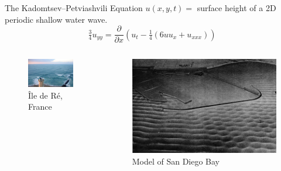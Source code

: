 \documentclass{beamer}
\begin{document}
\begin{frame}{The Kadomtsev--Petviashvili Equation}{}
  \vspace{10pt}
  $u(x,y,t) = $ surface height of a 2D periodic shallow water wave.
  \[
  \tfrac{3}{4} u_{yy} = \frac{\partial}{\partial x} \left(
  u_t - \tfrac{1}{4} \left(6uu_x + u_{xxx}\right) \right)
  \]

  \begin{columns}[T]
    \begin{column}{0.5\textwidth}
      \begin{figure}
        \centering
        \includegraphics[width=\textwidth]{images/livekp.jpg}
        \caption{\^{I}le de R\'{e}, France}
      \end{figure}
    \end{column}
    \begin{column}{0.5\textwidth}
      \begin{figure}
        \centering
        \includegraphics[width=\textwidth]{images/sd-harbor-model.jpg}
        \caption{Model of San Diego Bay}
      \end{figure}
    \end{column}
  \end{columns}
\end{frame}
\end{document}
